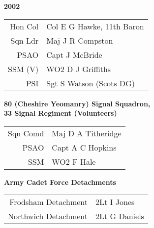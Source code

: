 \begin{center}
  \Huge
  \textbf{2002}
\end{center}

\begin{center}
  \small
  \begin{tabular}{rl}
    Hon Col & Col E G Hawke, 11th Baron \\
    Sqn Ldr & Maj J R Compston \\
    PSAO & Capt J McBride \\
    SSM (V) & WO2 D J Griffiths \\
    PSI & Sgt S Watson (Scots DG) \\
  \end{tabular}
\end{center}

\begin{center}
  \Large
  \textbf{80 (Cheshire Yeomanry) Signal Squadron, \\ 33 Signal Regiment (Volunteers)}
\end{center}

\begin{center}
  \small
  \begin{tabular}{rl}
    Sqn Comd & Maj D A Titheridge \\
    PSAO & Capt A C Hopkins \\
    SSM & WO2 F Hale \\
  \end{tabular}
\end{center}

\begin{center}
  \Large
  \textbf{Army Cadet Force Detachments}
\end{center}

\begin{center}
  \small
  \begin{tabular}{rl}
    Frodsham Detachment & 2Lt I Jones \\
    Northwich Detachment & 2Lt G Daniels \\
  \end{tabular}
\end{center}

\vspace{50mm}

\pagebreak
